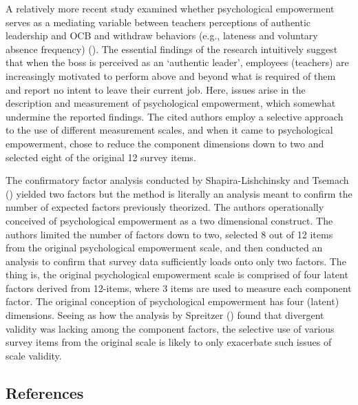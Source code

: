 \documentclass[
  11pt,
  a4paper,
]{article}
\begin{document}
A relatively more recent study examined whether psychological
empowerment serves as a mediating variable between teachers perceptions
of authentic leadership and OCB and withdraw behaviors (e.g., lateness
and voluntary absence frequency)
(). The essential findings of the research intuitively suggest that
when the boss is perceived as an `authentic leader', employees
(teachers) are increasingly motivated to perform above and beyond what
is required of them and report no intent to leave their current job.
Here, issues arise in the description and measurement of psychological
empowerment, which somewhat undermine the reported findings. The cited
authors employ a selective approach to the use of different measurement
scales, and when it came to psychological empowerment, chose to reduce
the component dimensions down to two and selected eight of the original
12 survey items.

The confirmatory factor analysis conducted by Shapira-Lishchinsky and
Tsemach () yielded two
factors but the method is literally an analysis meant to confirm the
number of expected factors previously theorized. The authors
operationally conceived of psychological empowerment as a two
dimensional construct. The authors limited the number of factors down to
two, selected 8 out of 12 items from the original psychological
empowerment scale, and then conducted an analysis to confirm that survey
data sufficiently loads onto only two factors. The thing is, the
original psychological empowerment scale is comprised of four latent
factors derived from 12-items, where 3 items are used to measure each
component factor. The original conception of psychological empowerment
has four (latent) dimensions. Seeing as how the analysis by Spreitzer
() found that divergent validity was
lacking among the component factors, the selective use of various survey
items from the original scale is likely to only exacerbate such issues
of scale validity.

\newpage

\subsection*{References}\label{references}
\end{document}
